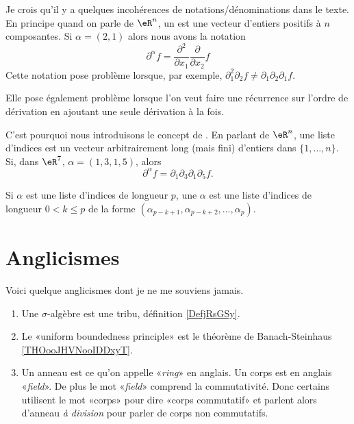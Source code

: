 \begin{normaltext}      \label{NORMooRRZCooMOKAzY}
	Je crois qu'il y a quelques incohérences de notations/dénominations dans le texte. En principe quand on parle de \( \eR^n\), un  \cite{BIBooYDMJooGDtdbo} est une vecteur d'entiers positifs à \( n\) composantes. Si \( \alpha=(2,1)\) alors nous avons la notation
	\begin{equation}
		\partial^{\alpha}f=\frac{ \partial^2  }{ \partial x_1 }\frac{ \partial  }{ \partial x_2 }f
	\end{equation}
	Cette notation pose problème lorsque, par exemple, \( \partial_1^2\partial_2f\neq \partial_1\partial_2\partial_1f\).

	Elle pose également problème lorsque l'on veut faire une récurrence sur l'ordre de dérivation en ajoutant une seule dérivation à la fois.

	C'est pourquoi nous introduisons le concept de . En parlant de \( \eR^n\), une liste d'indices est un vecteur arbitrairement long (mais fini) d'entiers dans \( \{ 1,\ldots, n \}\). Si, dans \( \eR^7\), \( \alpha=(1,3,1,5)\), alors
	\begin{equation}
		\partial^{\alpha}f=\partial_1\partial_3\partial_1\partial_5f.
	\end{equation}

	Si \( \alpha\) est une liste d'indices de longueur \( p\), une  \( \alpha\) est une liste d'indices de longueur \( 0 < k \leq p\) de la forme \( (\alpha_{p-k+1}, \alpha_{p-k+2},\ldots, \alpha_p)\).
\end{normaltext}


\section{Anglicismes}
\label{SECooPBZVooCVInFT}

Voici quelque anglicismes dont je ne me souviens jamais.
\begin{enumerate}
	\item
	      Une \( \sigma\)-algèbre est une tribu, définition \ref{DefjRsGSy}.
	\item
	      Le «uniform boundedness principle» est le théorème de Banach-Steinhaus \ref{THOooJHVNooIDDxyT}.
	\item
	      Un anneau est ce qu'on appelle «\emph{ring}» en anglais. Un corps est en anglais «\emph{field}». De plus le mot «\emph{field}» comprend la commutativité. Donc certains utilisent le mot «corps» pour dire «corps commutatif» et parlent alors d'anneau \emph{à division} pour parler de corps non commutatifs.
\end{enumerate}
